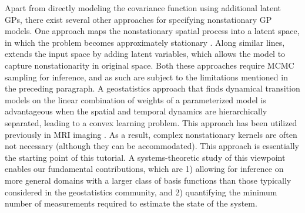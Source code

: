 Apart from directly modeling the covariance function using additional latent GPs, there exist several other approaches for specifying nonstationary GP models. One approach maps the nonstationary spatial process into a latent space, in which the problem becomes approximately stationary \cite{schmidt2003bayesian}. Along similar lines, \cite{pfingsten2006nonstationary} extends the input space by adding latent variables, which allows the model to capture  nonstationarity in original space. Both these approaches require MCMC sampling for inference, and as such are subject to the limitations mentioned in the preceding paragraph. 
A geostatistics approach that finds dynamical transition models on the linear combination of weights of a parameterized model \cite{cressie2011statistics,mardia1998kriged} is advantageous when the spatial and temporal dynamics are hierarchically separated, leading to a convex learning problem. 
This approach has been utilized previously in MRI imaging \cite{noh2007testing,noh2012space}.
As a result, complex nonstationary kernels are often not necessary (although they can be accommodated).
This approach is essentially the starting point of this tutorial. 
A systems-theoretic study of this viewpoint enables our fundamental contributions, which are 1) allowing for inference on more general domains with a larger class of basis functions than those typically considered in the geostatistics community, and 2) quantifying the minimum number of measurements required to estimate the state of the system. 

